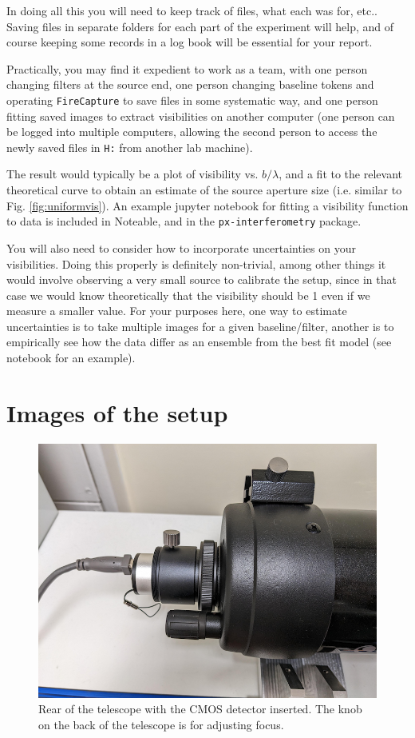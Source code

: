 \documentclass[11pt]{article}
\begin{document}
In doing all this you will need to keep track of files, what each was for, etc.. Saving files in separate folders for each part of the experiment will help, and of course keeping some records in a log book will be essential for your report.

Practically, you may find it expedient to work as a team, with one person changing filters at the source end, one person changing baseline tokens and operating \texttt{FireCapture} to save files in some systematic way, and one person fitting saved images to extract visibilities on another computer (one person can be logged into multiple computers, allowing the second person to access the newly saved files in \texttt{H:} from another lab machine).

The result would typically be a plot of visibility vs. $b/\lambda$, and a fit to the relevant theoretical curve to obtain an estimate of the source aperture size (i.e. similar to Fig. \ref{fig:uniformvis}). An example jupyter notebook for fitting a visibility function to data is included in Noteable, and in the \texttt{px-interferometry} package.

You will also need to consider how to incorporate uncertainties on your visibilities. Doing this properly is definitely non-trivial, among other things it would involve observing a very small source to calibrate the setup, since in that case we would know theoretically that the visibility should be 1 even if we measure a smaller value. For your purposes here, one way to estimate uncertainties is to take multiple images for a given baseline/filter, another is to empirically see how the data differ as an ensemble from the best fit model (see notebook for an example).

\clearpage
\appendix

\section{Images of the setup}

\begin{figure}[h]
    \centering
    \includegraphics[width=1\textwidth]{doc/tel.png}
    \caption{Rear of the telescope with the CMOS detector inserted. The knob on the back of the telescope is for adjusting focus.}
    \label{fig:tel}
\end{figure}
\end{document}
